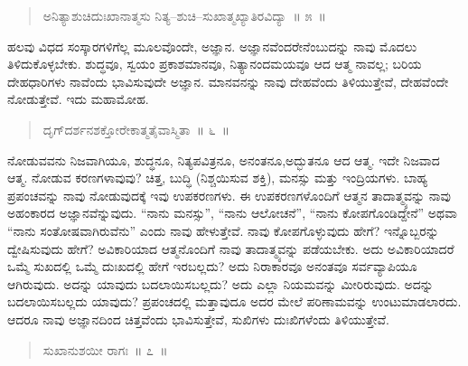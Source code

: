 \vspace{-0.3cm}

\begin{verse}
ಅನಿತ್ಯಾಶುಚಿದುಃಖಾನಾತ್ಮಸು ನಿತ್ಯ–ಶುಚಿ–ಸುಖಾತ್ಮಖ್ಯಾತಿರವಿದ್ಯಾ~॥ ೫~॥
\end{verse}

\vspace{-0.3cm}


\vskip 0.2cm

ಹಲವು ವಿಧದ ಸಂಸ್ಕಾರಗಳಿಗೆಲ್ಲ ಮೂಲವೊಂದೇ, ಅಜ್ಞಾನ. ಅಜ್ಞಾನವೆಂದರೇನೆಂಬು\break ದನ್ನು ನಾವು ಮೊದಲು ತಿಳಿದುಕೊಳ್ಳಬೇಕು. ಶುದ್ಧವೂ, ಸ್ವಯಂ ಪ್ರಕಾಶಮಾನವೂ, ನಿತ್ಯಾನಂದಮಯವೂ ಆದ ಆತ್ಮ ನಾವಲ್ಲ; ಬರಿಯ ದೇಹಧಾರಿಗಳು ನಾವೆಂದು ಭಾವಿಸುವುದೇ ಅಜ್ಞಾನ. ಮಾನವನನ್ನು ನಾವು ದೇಹವೆಂದು ತಿಳಿಯುತ್ತೇವೆ, ದೇಹವೆಂದೇ ನೋಡುತ್ತೇವೆ. ಇದು ಮಹಾಮೋಹ. 

\vspace{-0.3cm}

\begin{verse}
ದೃಗ್​ದರ್ಶನಶಕ್ತೋರೇಕಾತ್ಮತೈವಾಸ್ಮಿತಾ~॥ ೬~॥
\end{verse}

\vspace{-0.3cm}


\vskip 0.2cm

ನೋಡುವವನು ನಿಜವಾಗಿಯೂ, ಶುದ್ಧನೂ, ನಿತ್ಯಪವಿತ್ರನೂ, ಅನಂತನೂ,\break ಅದ್ಭುತನೂ ಆದ ಆತ್ಮ. ಇದೇ ನಿಜವಾದ ಆತ್ಮ. ನೋಡುವ ಕರಣಗಳಾವುವು? ಚಿತ್ತ, ಬುದ್ಧಿ (ನಿಶ್ಚಯಿಸುವ ಶಕ್ತಿ), ಮನಸ್ಸು ಮತ್ತು ಇಂದ್ರಿಯಗಳು. ಬಾಹ್ಯ ಪ್ರಪಂಚವನ್ನು ನಾವು ನೋಡುವುದಕ್ಕೆ ಇವು ಉಪಕರಣಗಳು. ಈ ಉಪಕರಣಗಳೊಂದಿಗೆ ಆತ್ಮನ ತಾದಾತ್ಮ್ಯವನ್ನು ನಾವು ಅಹಂಕಾರದ ಅಜ್ಞಾನವೆನ್ನುವುದು. “ನಾನು ಮನಸ್ಸು”, “ನಾನು ಆಲೋಚನೆ”, “ನಾನು ಕೋಪಗೊಂಡಿದ್ದೇನೆ” ಅಥವಾ “ನಾನು ಸಂತೋಷವಾಗಿರುವೆನು” ಎಂದು ನಾವು ಹೇಳುತ್ತೇವೆ. ನಾವು ಕೋಪಗೊಳ್ಳುವುದು ಹೇಗೆ? ಇನ್ನೊಬ್ಬರನ್ನು ದ್ವೇಷಿಸುವುದು ಹೇಗೆ? ಅವಿಕಾರಿಯಾದ ಆತ್ಮನೊಂದಿಗೆ ನಾವು ತಾದಾತ್ಮ್ಯವನ್ನು ಪಡೆಯಬೇಕು. ಅದು ಅವಿಕಾರಿಯಾದರೆ ಒಮ್ಮೆ ಸುಖದಲ್ಲಿ ಒಮ್ಮೆ ದುಃಖದಲ್ಲಿ ಹೇಗೆ ಇರಬಲ್ಲದು? ಅದು ನಿರಾಕಾರವೂ ಅನಂತವೂ ಸರ್ವವ್ಯಾಪಿಯೂ ಆಗಿರುವುದು. ಅದನ್ನು ಯಾವುದು ಬದಲಾಯಿಸಬಲ್ಲದು? ಅದು ಎಲ್ಲಾ ನಿಯಮವನ್ನು ಮೀರಿರುವುದು. ಅದನ್ನು ಬದಲಾಯಿಸಬಲ್ಲದು ಯಾವುದು? ಪ್ರಪಂಚದಲ್ಲಿ ಮತ್ತಾವುದೂ ಅದರ ಮೇಲೆ ಪರಿಣಾಮವನ್ನು ಉಂಟುಮಾಡಲಾರದು. ಆದರೂ ನಾವು ಅಜ್ಞಾನದಿಂದ ಚಿತ್ತವೆಂದು ಭಾವಿಸುತ್ತೇವೆ, ಸುಖಿಗಳು ದುಃಖಿಗಳೆಂದು ತಿಳಿಯುತ್ತೇವೆ. 

\vspace{-0.3cm}

\begin{verse}
ಸುಖಾನುಶಯೀ ರಾಗಃ~॥ ೭~॥
\end{verse}

